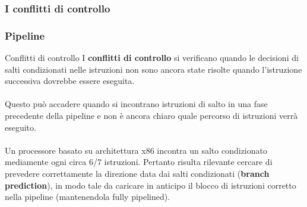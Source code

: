 \subsubsection[I conflitti di controllo]{I conflitti di controllo}
\begin{frame}
	\frametitle{ Pipeline}

	\begin{block}{Conflitti di controllo}
		I \textbf{conflitti di controllo} si verificano quando le decisioni di salti condizionati nelle istruzioni non sono ancora state risolte quando l'istruzione successiva dovrebbe essere eseguita.\\~\\
		Questo può accadere quando si incontrano istruzioni di salto in una fase precedente della pipeline e non è ancora chiaro quale percorso di istruzioni verrà eseguito.\\~\\
		Un processore basato su architettura x86 incontra un salto condizionato mediamente ogni circa 6/7 istruzioni. Pertanto risulta rilevante cercare di prevedere correttamente la direzione data dai salti condizionati (\textbf{branch prediction}), in modo tale da caricare in anticipo il blocco di istruzioni corretto nella pipeline (mantenendola fully pipelined).
	\end{block}
\end{frame}


